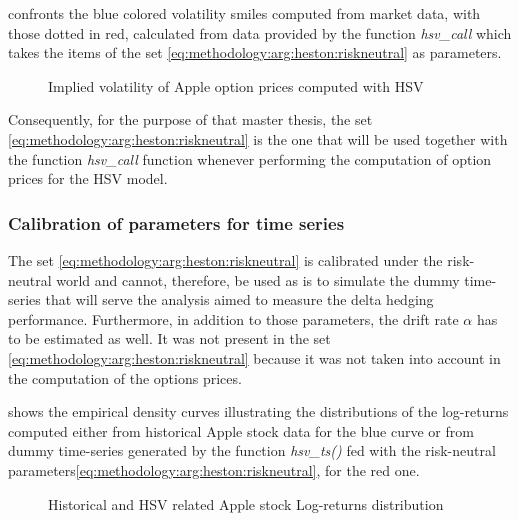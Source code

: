 \documentclass[12pt]{report}
\begin{document}
 confronts the blue colored volatility smiles computed from market data, with those dotted in red, calculated from data provided by the function \textit{hsv\_call} which takes the items of the set \ref{eq:methodology:arg:heston:riskneutral} as parameters.

\begin{figure}[h]
  \centering
  
  \caption{Implied volatility of Apple option prices computed with HSV}
  \label{p:methodology:impliedvol:aapl:heston}
\end{figure}


Consequently, for the purpose of that master thesis, the set \ref{eq:methodology:arg:heston:riskneutral} is the one that will be used together with the function \textit{hsv\_call} function whenever performing the computation of option prices for the HSV model.

\subsubsection*{Calibration of parameters for time series}

The set \ref{eq:methodology:arg:heston:riskneutral} is calibrated under the risk-neutral world and cannot, therefore, be used as is to simulate the dummy time-series that will serve the analysis aimed to measure the delta hedging performance.
Furthermore, in addition to those parameters, the drift rate $\alpha$ has to be estimated as well. It was not present in the set  \ref{eq:methodology:arg:heston:riskneutral} because it was not taken into account in the computation of the options prices.

 shows the empirical density curves illustrating the distributions of the log-returns computed either from historical Apple stock data for the blue curve or from dummy time-series generated by the function \textit{hsv\_ts()} fed with the risk-neutral parameters\ref{eq:methodology:arg:heston:riskneutral}, for the red one.


\begin{figure}[h]
  \centering
  
  \caption{Historical and HSV related Apple stock Log-returns distribution}
  \label{p:methodology:density:aapl:heston:riskneutral}
\end{figure}
\end{document}
